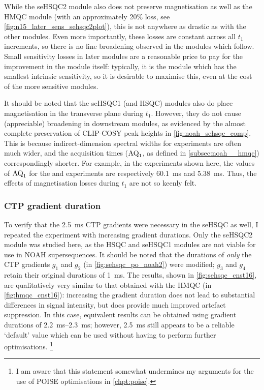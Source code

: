 While the \nitrogen{} seHSQC2 module also does not preserve  magnetisation as well as the HMQC module (with an approximately 20\% loss, see \cref{fig:n15_later_sens_sehsqc2plot}), this is not anywhere as drastic as with the other modules.
Even more importantly, these losses are constant across all $t_1$ increments, so there is no line broadening observed in the modules which follow.
Small sensitivity losses in later modules are a reasonable price to pay for the improvement in the \nitrogen{} module itself: typically, it is the \nitrogen{} module which has the smallest intrinsic sensitivity, so it is desirable to maximise this, even at the cost of the more sensitive modules.

It should be noted that the \carbon{} seHSQC1 (and HSQC) modules also do place  magnetisation in the transverse plane during $t_1$.
However, they do not cause (appreciable) broadening in downstream modules, as evidenced by the almost complete preservation of CLIP-COSY peak heights in \cref{fig:noah_sehsqc_comp}.
This is because indirect-dimension spectral widths for \carbon{} experiments are often much wider, and the acquisition times ($\text{AQ}_1$, as defined in \cref{subsec:noah__hmqc}) correspondingly shorter.
For example, in the  experiments shown here, the values of $\text{AQ}_1$ for the \nitrogen{} and \carbon{} experiments are respectively \qty{60.1}{\ms} and \qty{5.38}{\ms}.
Thus, the effects of magnetisation losses during $t_1$ are not so keenly felt.


\subsubsection{CTP gradient duration}

To verify that the \qty{2.5}{\ms} CTP gradients were necessary in the \nitrogen{} seHSQC as well, I repeated the  experiment with increasing gradient durations.
Only the seHSQC2 module was studied here, as the HSQC and seHSQC1 modules are not viable for use in NOAH supersequences.
It should be noted that the durations of \textit{only} the CTP gradients $g_1$ and $g_2$ (in \cref{fig:sehsqc_po_noah2}) were modified; $g_3$ and $g_4$ retain their original durations of \qty{1}{\ms}.
The results, shown in \cref{fig:sehsqc_cnst16}, are qualitatively very similar to that obtained with the HMQC (in \cref{fig:hmqc_cnst16}): increasing the gradient duration does not lead to substantial differences in signal intensity, but does provide much improved artefact suppression.
In this case, equivalent results can be obtained using gradient durations of \qtyrange{2.2}{2.3}{\ms}; however, \qty{2.5}{\ms} still appears to be a reliable `default' value which can be used without having to perform further optimisations.%
\footnote{I am aware that this statement somewhat undermines my arguments for the use of POISE optimisations in \cref{chpt:poise}.}

